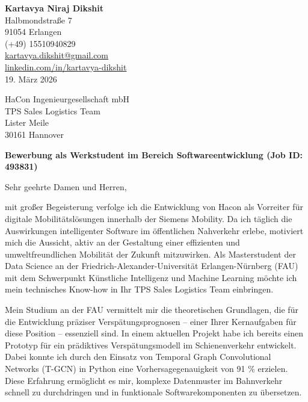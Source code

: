 \documentclass[a4paper,10pt]{article}
\begin{document}
\begin{flushright}
    \textbf{\color{primarycolor} Kartavya Niraj Dikshit} \\
    Halbmondstraße 7 \\
    91054 Erlangen \\
    \faPhone* (+49) 15510940829 \\
    \faEnvelope* \href{mailto:kartavya.dikshit@gmail.com}{kartavya.dikshit@gmail.com} \\
    \faLinkedin \href{http://www.linkedin.com/in/kartavya-dikshit}{linkedin.com/in/kartavya-dikshit} \\
    \vspace{1cm}
    19. März 2026
\end{flushright}

\begin{flushleft}
    HaCon Ingenieurgesellschaft mbH \\
    TPS Sales Logistics Team \\
    Lister Meile \\
    30161 Hannover \\
\end{flushleft}

\vspace{1cm}

\textbf{\large \color{primarycolor} Bewerbung als Werkstudent im Bereich Softwareentwicklung (Job ID: 493831)}

\vspace{0.5cm}

Sehr geehrte Damen und Herren,

mit großer Begeisterung verfolge ich die Entwicklung von Hacon als Vorreiter für digitale Mobilitätslösungen innerhalb der Siemens Mobility. Da ich täglich die Auswirkungen intelligenter Software im öffentlichen Nahverkehr erlebe, motiviert mich die Aussicht, aktiv an der Gestaltung einer effizienten und umweltfreundlichen Mobilität der Zukunft mitzuwirken. Als Masterstudent der Data Science an der Friedrich-Alexander-Universität Erlangen-Nürnberg (FAU) mit dem Schwerpunkt Künstliche Intelligenz und Machine Learning möchte ich mein technisches Know-how in Ihr TPS Sales Logistics Team einbringen.

Mein Studium an der FAU vermittelt mir die theoretischen Grundlagen, die für die Entwicklung präziser Verspätungsprognosen – einer Ihrer Kernaufgaben für diese Position – essenziell sind. In einem aktuellen Projekt habe ich bereits einen Prototyp für ein prädiktives Verspätungsmodell im Schienenverkehr entwickelt. Dabei konnte ich durch den Einsatz von Temporal Graph Convolutional Networks (T-GCN) in Python eine Vorhersagegenauigkeit von 91 \% erzielen. Diese Erfahrung ermöglicht es mir, komplexe Datenmuster im Bahnverkehr schnell zu durchdringen und in funktionale Softwarekomponenten zu übersetzen.
\end{document}
